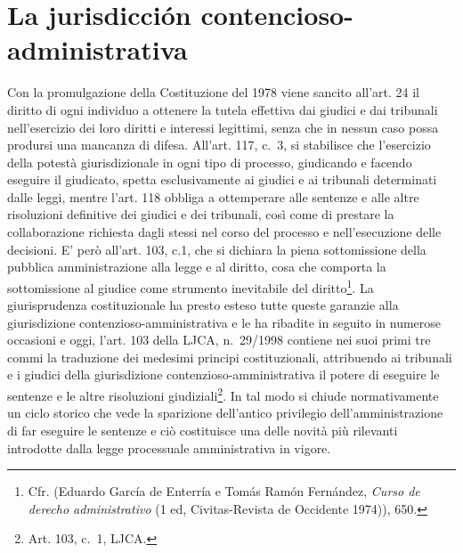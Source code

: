 \documentclass[12pt,it,a4paper,]{report}
\begin{document}
\hypertarget{la-jurisdicciuxf3n-contencioso-administrativa}{%
\section{La jurisdicción
contencioso-administrativa}\label{la-jurisdicciuxf3n-contencioso-administrativa}}

Con la promulgazione della Costituzione del 1978 viene sancito all'art.
24 il diritto di ogni individuo a ottenere la tutela effettiva dai
giudici e dai tribunali nell'esercizio dei loro diritti e interessi
legittimi, senza che in nessun caso possa prodursi una mancanza di
difesa. All'art. 117, c.~3, si stabilisce che l'esercizio della potestà
giurisdizionale in ogni tipo di processo, giudicando e facendo eseguire
il giudicato, spetta esclusivamente ai giudici e ai tribunali
determinati dalle leggi, mentre l'art. 118 obbliga a ottemperare alle
sentenze e alle altre risoluzioni definitive dei giudici e dei
tribunali, così come di prestare la collaborazione richiesta dagli
stessi nel corso del processo e nell'esecuzione delle decisioni. E' però
all'art. 103, c.1, che si dichiara la piena sottomissione della pubblica
amministrazione alla legge e al diritto, cosa che comporta la
sottomissione al giudice come strumento inevitabile del
diritto\footnote{Cfr. (Eduardo García de Enterría e Tomás Ramón
  Fernández, \emph{Curso de derecho administrativo} (1 ed,
  Civitas-Revista de Occidente 1974)), 650.}. La giurisprudenza
costituzionale ha presto esteso tutte queste garanzie alla giurisdizione
contenzioso-amministrativa e le ha ribadite in seguito in numerose
occasioni e oggi, l'art. 103 della LJCA, n.~29/1998 contiene nei suoi
primi tre commi la traduzione dei medesimi principi costituzionali,
attribuendo ai tribunali e i giudici della giurisdizione
contenzioso-amministrativa il potere di eseguire le sentenze e le altre
risoluzioni giudiziali\footnote{Art. 103, c.~1, LJCA.}. In tal modo si
chiude normativamente un ciclo storico che vede la sparizione
dell'antico privilegio dell'amministrazione di far eseguire le sentenze
e ciò costituisce una delle novità più rilevanti introdotte dalla legge
processuale amministrativa in vigore.
\end{document}
